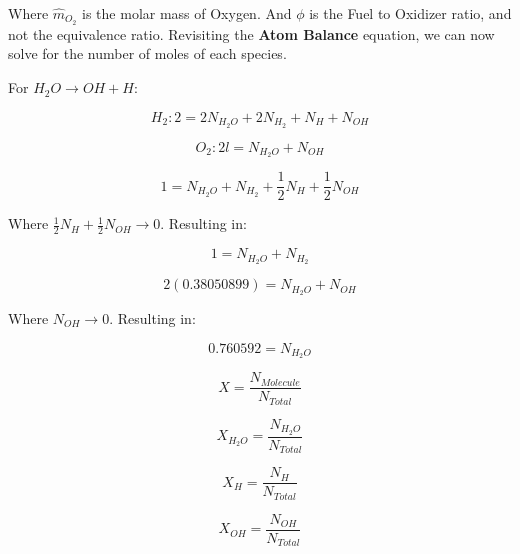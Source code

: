 \documentclass[12pt, Times New Roman]{article}
\begin{document}
    Where $\hat{m}_{O_{2}}$ is the molar mass of Oxygen. And $\phi$ is the Fuel to Oxidizer ratio, and not the equivalence ratio.
    Revisiting the \textbf{Atom Balance} equation, we can now solve for the number of moles of each species. 

    For $H_{2}O \rightarrow OH + H$:

    \begin{equation}
        H_{2}: 2 = 2N_{H_{2}O} + 2N_{H_{2}} + N_{H} + N_{OH}
    \end{equation}

    \begin{equation}
        O_{2}: 2l = N_{H_{2}O} + N_{OH}
    \end{equation}

    \begin{equation}
        1 = N_{H_{2}O} + N_{H_{2}} + \frac{1}{2}N_{H} + \frac{1}{2}N_{OH}
    \end{equation}

    Where $\frac{1}{2}N_{H} + \frac{1}{2}N_{OH} \rightarrow 0$. Resulting in:

    \begin{equation}
        1 = N_{H_{2}O} + N_{H_{2}}
    \end{equation}

    \begin{equation}
        2(0.38050899) = N_{H_{2}O} + N_{OH}
    \end{equation}

    Where $N_{OH} \rightarrow 0$. Resulting in:

    \begin{equation}
        0.760592 = N_{H_{2}O}
    \end{equation}

    \begin{equation}
        X = \frac{N_{Molecule}}{N_{Total}}
    \end{equation}

    \begin{equation}
        X_{H_{2}O} = \frac{N_{H_{2}O}}{N_{Total}}
    \end{equation}

    \begin{equation}
        X_{H} = \frac{N_{H}}{N_{Total}}
    \end{equation}

    \begin{equation}
        X_{OH} = \frac{N_{OH}}{N_{Total}}
    \end{equation}
        
\end{document}
